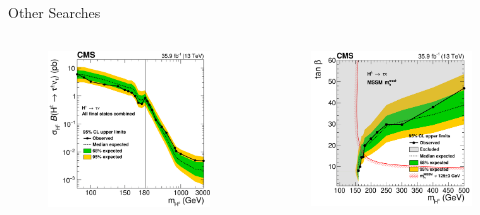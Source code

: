 \documentclass[aspectratio=169,xcolor=table]{beamer}
\begin{document}
    \begin{frame}[t]{Other \HpmLong Searches}
    \begin{columns}
      \centering
      \begin{figure}
      \includegraphics[width=.8\textwidth,keepaspectratio=true]{CMS_taunu_xsec_limits.png}
      \caption{\tiny \cite{CMS-taunu} }
      \end{figure}
      \centering
      \begin{figure}
      \includegraphics[width=.8\textwidth,keepaspectratio=true]{CMS_taunu_tanb_limits.png}
      \caption{\tiny \cite{CMS-taunu} }
      \end{figure}
    \end{columns}
    \end{frame}
\end{document}
